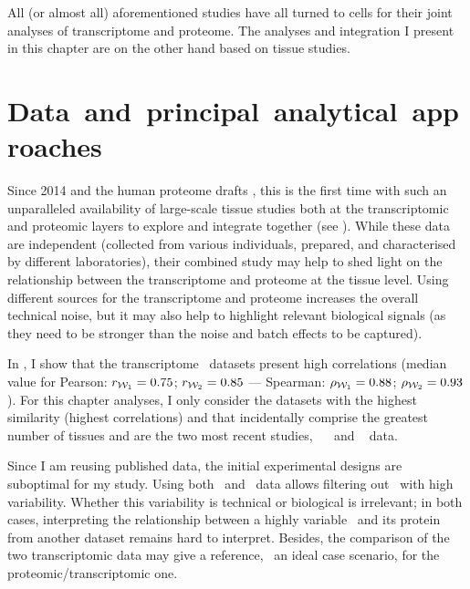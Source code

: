 All (or almost all) aforementioned studies have all turned to cells
for their joint analyses of transcriptome and proteome.
The analyses and integration I present in this chapter are
on the other hand based on tissue studies.

\vspace{-2mm}
\section{Data~and~principal~analytical~approaches}\label{sec:IntegrationData}
\vspace{-4mm}
Since 2014 and the human proteome drafts ,
this is the first time with such
an unparalleled availability of large-scale tissue studies
both at the transcriptomic and proteomic layers to explore and integrate together
(see ).
While these data are independent
(collected from various individuals, prepared,
and characterised by different laboratories),
their combined study may help
to shed light on the relationship
between the transcriptome and proteome at the tissue level.
Using different sources for the transcriptome and proteome
increases the overall technical noise,
but it may also help to highlight relevant biological signals (as
they need to be stronger than the noise and batch effects to be captured).

In , I show that
the transcriptome \Rnaseq\ datasets present high correlations
(median value for Pearson: $r_{\mathcal{W}_1}=0.75$; $r_{\mathcal{W}_2}=0.85$ ---
Spearman: $\rho_{\mathcal{W}_1}=0.88$; $\rho_{\mathcal{W}_2}=0.93$).
For this chapter analyses,
I only consider the datasets with the highest similarity
(highest correlations) and
that incidentally comprise the greatest number of tissues
and are the two most recent studies,
\ie\ ~
and ~ data.\\
\vspace{-\baselineskip}

Since I am reusing published data,
the initial experimental designs are suboptimal for my study.
Using both \uhlen\ and \gtex\ data
allows filtering out \mRNAs\ with high variability.
Whether this variability is technical or biological is irrelevant;
in both cases,
interpreting the relationship
between a highly variable \mRNAs\ and its protein from another dataset
remains hard to interpret.
Besides, the comparison of the two transcriptomic data may give a reference,
\ie\ an ideal case scenario, for the proteomic/transcriptomic one.

